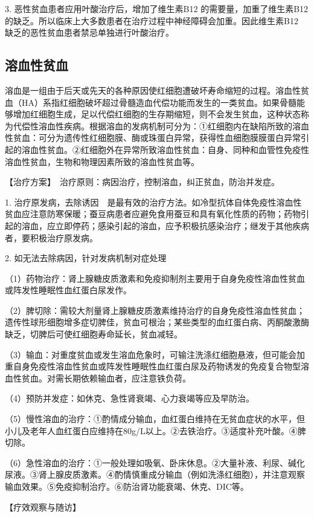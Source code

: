 3. 恶性贫血患者应用叶酸治疗后，增加了维生素B{12}
的需要量，加重了维生素B{12}
的缺乏。所以临床上大多数患者在治疗过程中神经障碍会加重。因此维生素B{12}
缺乏的恶性贫血患者禁忌单独进行叶酸治疗。

\subsection{溶血性贫血}

溶血是一组由于后天或先天的各种原因使红细胞遭破坏寿命缩短的过程。溶血性贫血（HA）系指红细胞破坏超过骨髓造血代偿功能而发生的一类贫血。如果骨髓能够增加红细胞生成，足以代偿红细胞的生存期缩短，则不会发生贫血，这种状态称为代偿性溶血性疾病。根据溶血的发病机制可分为：①红细胞内在缺陷所致的溶血性贫血：可分为遗传性红细胞膜、酶或珠蛋白异常，获得性血细胞膜膜蛋白异常引起的溶血性贫血。②红细胞外在异常所致溶血性贫血：自身、同种和血管性免疫性溶血性贫血，生物和物理因素所致的溶血性贫血等。

【治疗方案】　治疗原则：病因治疗，控制溶血，纠正贫血，防治并发症。

1.
治疗原发病，去除诱因　是最有效的治疗方法。如冷型抗体自体免疫性溶血性贫血应注意防寒保暖；蚕豆病患者应避免食用蚕豆和具有氧化性质的药物；药物引起的溶血，应立即停药；感染引起的溶血，应予积极抗感染治疗；继发于其他疾病者，要积极治疗原发病。

2. 如无法去除病因，针对发病机制对症处理

（1）药物治疗：肾上腺糖皮质激素和免疫抑制剂主要用于自身免疫性溶血性贫血或阵发性睡眠性血红蛋白尿发作。

（2）脾切除：需较大剂量肾上腺糖皮质激素维持治疗的自身免疫性溶血性贫血；遗传性球形细胞增多症切脾佳，贫血可根治；某些类型的血红蛋白病、丙酮酸激酶缺乏，切脾后可使红细胞寿命延长，贫血减轻。

（3）输血：对重度贫血或发生溶血危象时，可输注洗涤红细胞悬液，但可能会加重自身免疫性溶血性贫血或阵发性睡眠性血红蛋白尿及药物诱发的免疫复合物型溶血性贫血。对需长期依赖输血者，应注意铁负荷。

（4）预防并发症：如休克、急性肾衰竭、心力衰竭等应及早防治。

（5）慢性溶血的治疗：①酌情成分输血，血红蛋白维持在无贫血症状的水平，但小儿及老年人血红蛋白应维持在80g/L以上。②去铁治疗。③适度补充叶酸。④脾切除。

（6）急性溶血的治疗：①一般处理如吸氧、卧床休息。②大量补液、利尿、碱化尿液。③肾上腺皮质激素。④酌情慎重成分输血（例如洗涤红细胞），并注意观察输血效果。⑤免疫抑制治疗。⑥防治肾功能衰竭、休克、DIC等。

【疗效观察与随访】

